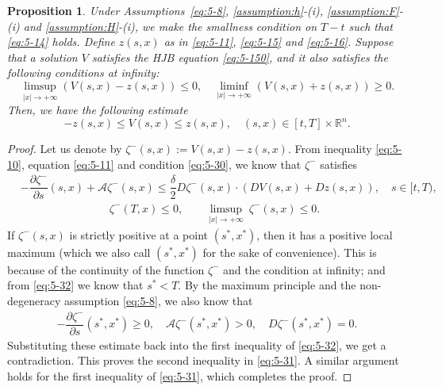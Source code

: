 \documentclass[11pt]{article}
\numberwithin{equation}{section}
\newtheorem{proposition}[theorem]{Proposition}
\newcommand{\brn}{{\mathbb{R}^n}}
\newcommand{\1}{\mbox{1\hspace{-1mm}I}}
\begin{document}
\begin{proposition}\label{prop5-1}
Under Assumptions~\ref{eq:5-8}, \ref{assumption:h}-(i), \ref{assumption:F}-(i) and \ref{assumption:H}-(i), we make the smallness condition on $T-t$ such that \eqref{eq:5-14} holds. Define $z(s,x)$ as in \eqref{eq:5-11}, \eqref{eq:5-15} and \eqref{eq:5-16}. Suppose that a solution $V$ satisfies the HJB equation \eqref{eq:5-150}, and it also satisfies the following  conditions at infinity:
\begin{equation}\label{eq:5-30}
    \limsup_{|x|\rightarrow+\infty}\left(V(s,x)-z(s,x)\right)\le 0,\quad \liminf_{|x|\rightarrow+\infty}\left(V(s,x)+z(s,x)\right) \geq 0.
\end{equation}
Then, we have the following estimate 
\begin{equation}\label{eq:5-31}
    -z(s,x)\le V(s,x)\leq z(s,x),\quad (s,x)\in[t,T]\times\brn.
\end{equation}
\end{proposition}

\begin{proof}
Let us denote by $\zeta^{-}(s,x):=V(s,x)-z(s,x).$ From inequality \eqref{eq:5-10}, equation \eqref{eq:5-11} and condition \eqref{eq:5-30}, we know that $\zeta^{-}$ satisfies
\begin{equation}\label{eq:5-32}
\begin{aligned}
    &-\dfrac{\partial \zeta^{-}}{\partial s}(s,x)+\mathcal{A}\zeta^{-}(s,x)\le \dfrac{\delta}{2}D\zeta^{-}(s,x)\cdot (DV(s,x)+Dz(s,x)), \quad s\in[t,T),\\
    &\qquad\qquad\qquad\qquad \zeta^{-}(T,x)\le 0,\qquad \limsup_{|x|\rightarrow+\infty}\:\zeta^{-}(s,x)\le 0.
\end{aligned}
\end{equation}
If $\zeta^{-}(s,x)$ is strictly positive at a point $\left(s^{*},x^{*}\right)$, then it has a positive local maximum (which we also call $\left(s^{*},x^{*}\right)$ for the sake of convenience). This is because of the continuity of
the function $\zeta^{-}$ and the condition at infinity; and from \eqref{eq:5-32} we know that $s^{*}<T$. By the maximum principle and the non-degeneracy assumption \ref{eq:5-8}, we also know that 
\begin{align*}
    -\dfrac{\partial \zeta^{-}}{\partial s}\left(s^{*},x^{*}\right)\geq 0, \quad \mathcal{A}\zeta^{-}\left(s^{*},x^{*}\right)>0,\quad D\zeta^{-}\left(s^{*},x^{*}\right)=0.
\end{align*}
Substituting these estimate back into the first inequality of \eqref{eq:5-32}, we get a contradiction. This proves the second inequality in \eqref{eq:5-31}. A similar argument holds for the first inequality of \eqref{eq:5-31}, which completes the proof.
\end{proof}
\end{document}

